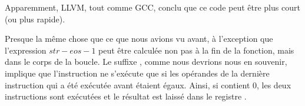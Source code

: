 Apparemment, LLVM, tout comme GCC, conclu que ce code peut être plus court (ou plus
rapide).

\mysubparagraph{\OptimizingKeilVI (\ARMMode)}




Presque la même chose que ce que nous avions vu avant, à l'exception que l'expression
$str - eos - 1$ peut être calculée non pas à la fin de la fonction, mais dans le
corps de la boucle.
Le suffixe , comme nous devrions nous en souvenir, implique que l'instruction
ne s'exécute que si les opérandes de la dernière instruction \CMP qui a été exécutée
avant étaient égaux.
Ainsi, si  contient 0, les deux instructions  sont exécutées et
le résultat est laissé dans le registre .
